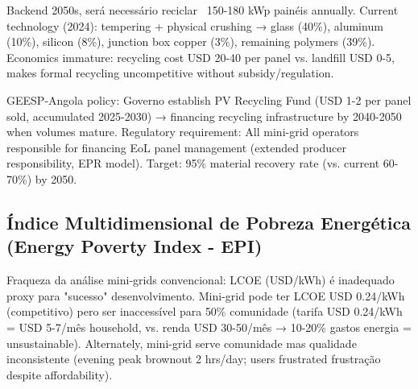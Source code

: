 \documentclass[12pt, a4paper]{article}
\begin{document}
Backend 2050s, será necessário reciclar ~150-180 kWp painéis annually. Current technology (2024): tempering + physical crushing → glass (40\%), aluminum (10\%), silicon (8\%), junction box copper (3\%), remaining polymers (39\%). Economics immature: recycling cost USD 20-40 per panel vs. landfill USD 0-5, makes formal recycling uncompetitive without subsidy/regulation.

GEESP-Angola policy: Governo establish PV Recycling Fund (USD 1-2 per panel sold, accumulated 2025-2030) → financing recycling infrastructure by 2040-2050 when volumes mature. Regulatory requirement: All mini-grid operators responsible for financing EoL panel management (extended producer responsibility, EPR model). Target: 95\% material recovery rate (vs. current 60-70\%) by 2050.

\subsection{Índice Multidimensional de Pobreza Energética (Energy Poverty Index - EPI)}

Fraqueza da análise mini-grids convencional: LCOE (USD/kWh) é inadequado proxy para "sucesso" desenvolvimento. Mini-grid pode ter LCOE USD 0.24/kWh (competitivo) pero ser inaccessível para 50\% comunidade (tarifa USD 0.24/kWh = USD 5-7/mês household, vs. renda USD 30-50/mês → 10-20\% gastos energia = unsustainable). Alternately, mini-grid serve comunidade mas qualidade inconsistente (evening peak brownout 2 hrs/day; users frustrated frustração despite affordability).
\end{document}
